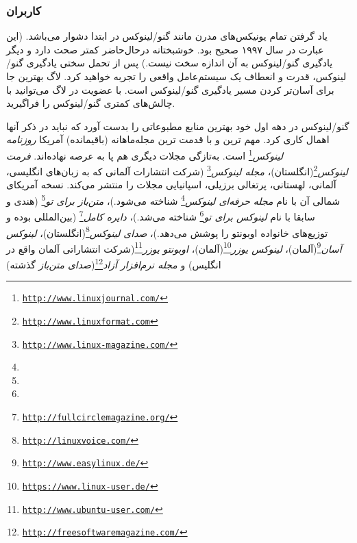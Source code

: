 \subsubsection{کاربران}

یاد گرفتن تمام یونیکس‌های مدرن مانند گنو/لینوکس در ابتدا دشوار می‌باشد.
(این عبارت در سال ۱۹۹۷  صحیح بود. خوشبختانه درحال‌حاضر
کمتر صحت دارد و دیگر یادگیری گنو/لینوکس به آن اندازه سخت نیست.)
پس از تحمل سختی یادگیری گنو/لینوکس، قدرت و انعطاف یک سیستم‌عامل واقعی را
تجربه خواهید کرد. لاگ بهترین جا برای آسان‌تر کردن مسیر یادگیری گنو/لینوکس است.
با عضویت در لاگ می‌توانید با چالش‌های کمتری گنو/لینوکس را فراگیرید.

گنو/لینوکس در دهه اول خود بهترین منابع مطبوعاتی را بدست آورد
که نباید در ذکر آنها اهمال کاری کرد.
مهم ترین و با قدمت ترین مجله‌ماهانه (باقیمانده) آمریکا
\emph{روزنامه لینوکس}\footnote{\texttt{\url{http://www.linuxjournal.com/}}}
است. به‌تازگی مجلات دیگری هم پا به عرصه نهاده‌اند.
\emph{فرمت لینوکس}\footnote{\texttt{\url{http://www.linuxformat.com}}}‌(انگلستان)،
\emph{مجله لینوکس}\footnote{\texttt{\url{http://www.linux-magazine.com/}}}
(شرکت انتشارات آلمانی که به زبان‌های انگلیسی،
آلمانی، لهستانی، پرتغالی برزیلی، اسپانیایی
مجلات را منتشر می‌کند. نسخه آمریکای شمالی آن
با نام
\emph{مجله حرفه‌ای لینوکس}\footnote{}
شناخته می‌شود.)،
\emph{متن‌باز برای تو}\footnote{}
(هندی و سابقا با نام
\emph{لینوکس برای تو}\footnote{}
شناخته می‌شد.)،
\emph{دایره کامل}\footnote{\texttt{\url{http://fullcirclemagazine.org/}}}
(بین‌المللی بوده و توزیع‌های خانواده اوبونتو را پوشش می‌دهد.)،
\emph{صدای لینوکس}\footnote{\texttt{\url{http://linuxvoice.com/}}}(انگلستان)،
\emph{لینوکس آسان}\footnote{\texttt{\url{http://www.easylinux.de/}}}(آلمان)،
\emph{لینوکس یوزر}\footnote{\texttt{\url{https://www.linux-user.de/}}}(آلمان)،
\emph{اوبونتو یوزر}\footnote{\texttt{\url{http://www.ubuntu-user.com/}}}(شرکت انتشاراتی آلمان واقع در انگلیس)
و
\emph{مجله نرم‌افزار آزاد}\footnote{\texttt{\url{http://freesoftwaremagazine.com/}}}({\itshape صدای متن‌باز} گذشته)

